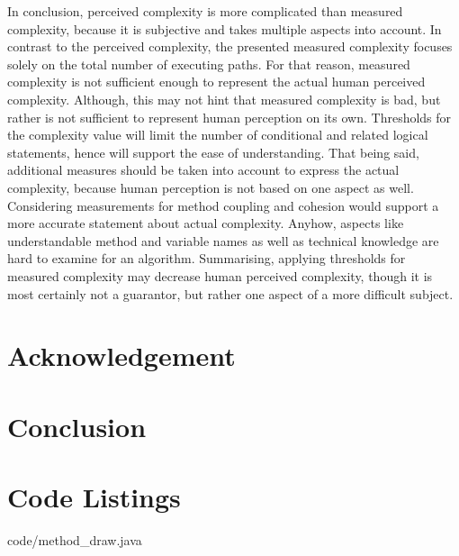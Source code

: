 \documentclass[conference]{IEEEtran}
\begin{document}
In conclusion, perceived complexity is more complicated than measured complexity, because it is subjective and takes multiple aspects into account. In contrast to the perceived complexity, the presented measured complexity focuses solely on the total number of executing paths. For that reason, measured complexity is not sufficient enough to represent the actual human perceived complexity. Although, this may not hint that measured complexity is bad, but rather is not sufficient to represent human perception on its own. Thresholds for the complexity value will limit the number of conditional and related logical statements, hence will support the ease of understanding. That being said, additional measures should be taken into account to express the actual complexity, because human perception is not based on one aspect as well. Considering measurements for method coupling and cohesion would support a more accurate statement about actual complexity. Anyhow, aspects like understandable method and variable names as well as technical knowledge are hard to examine for an algorithm. Summarising, applying thresholds for measured complexity may decrease human perceived complexity, though it is most certainly not a guarantor, but rather one aspect of a more difficult subject.

\section{Acknowledgement}
\blindtext

\section{Conclusion}
\blindtext

\appendix
\section{Code Listings}


{code/method_draw.java}
\end{document}
